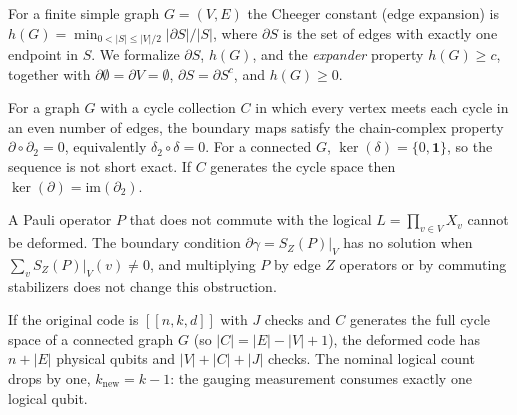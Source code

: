 \begin{remark}
\label{rem:4_notation_cheeger_constant}
\leanok
For a finite simple graph $G = (V,E)$ the Cheeger constant (edge expansion) is
$h(G) = \min_{0 < |S| \le |V|/2} |\partial S| / |S|$, where $\partial S$ is the set of edges
with exactly one endpoint in $S$. We formalize $\partial S$, $h(G)$, and the
\emph{expander} property $h(G) \ge c$, together with $\partial \emptyset = \partial V = \emptyset$,
$\partial S = \partial S^c$, and $h(G) \ge 0$.
\end{remark}

\begin{remark}
\label{rem:5_exactness_of_sequences}
\leanok
For a graph $G$ with a cycle collection $C$ in which every vertex meets each cycle in an
even number of edges, the boundary maps satisfy the chain-complex property
$\partial \circ \partial_2 = 0$, equivalently $\delta_2 \circ \delta = 0$. For a connected
$G$, $\ker(\delta) = \{0, \mathbf{1}\}$, so the sequence is not short exact. If $C$ generates
the cycle space then $\ker(\partial) = \mathrm{im}(\partial_2)$.
\end{remark}

\begin{remark}
\label{rem:6_noncommuting_cannot_be_deformed}
\leanok
A Pauli operator $P$ that does not commute with the logical $L = \prod_{v \in V} X_v$ cannot
be deformed. The boundary condition $\partial \gamma = S_Z(P)|_V$ has no solution when
$\sum_v S_Z(P)|_V (v) \ne 0$, and multiplying $P$ by edge $Z$ operators or by commuting
stabilizers does not change this obstruction.
\end{remark}

\begin{remark}
\label{rem:7_codespace_dimension_after_gauging}
\leanok
If the original code is $[[n,k,d]]$ with $J$ checks and $C$ generates the full cycle space
of a connected graph $G$ (so $|C| = |E| - |V| + 1$), the deformed code has $n + |E|$ physical
qubits and $|V| + |C| + |J|$ checks. The nominal logical count drops by one,
$k_{\text{new}} = k - 1$: the gauging measurement consumes exactly one logical qubit.
\end{remark}

